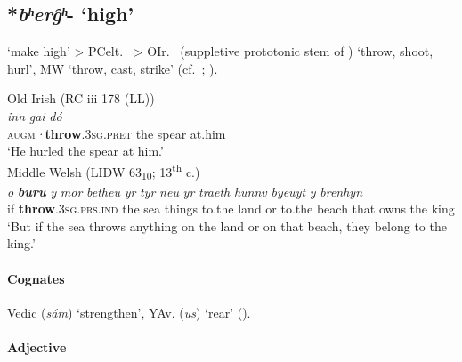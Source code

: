 \documentclass[output=paper,colorlinks,citecolor=brown]{langscibook}
\begin{document}
\subsection{*\textit{bʰerg̑ʰ}- ‘high’}
\label{sec:Caushigh}

 ‘make high’ > PCelt.\  > OIr.\   (suppletive prototonic stem of ) ‘throw, shoot, hurl’, MW  ‘throw, cast, strike’ (cf.\ \citealt[55--56]{Schrijver1995}; \citealt[120--121]{Schulze-Thulin2001}).


\begin{exe}
    \ex Old Irish (RC iii 178 (LL))\label{ex:Caushigh1}\\
         \textit{inn} \textit{gai} \textit{dó}  \\
        \textsc{augm}\textit{·}\textbf{throw}.\textsc{3sg.pret} the spear at.him\\
        \glt ‘He hurled the spear at him.’\\
    \ex Middle Welsh (LIDW 63\textsubscript{10}; 13\textsuperscript{th} c.)\label{ex:Caushigh2}\\
        \gll \textit{o} {\textbf{\textit{buru}} } \textit{y} \textit{mor} \textit{betheu} \textit{yr} \textit{tyr} \textit{neu} \textit{yr} \textit{traeth} \textit{hunnv} \textit{byeuyt} \textit{y} \textit{brenhyn} \\
        if \textbf{throw}.\textsc{3sg.prs.ind} the sea things to.the land or to.the beach that owns the king\\
        \glt ‘But if the sea throws anything on the land or on that beach, they belong to the king.’\\
\end{exe}

\paragraph*{Cognates}

Vedic (\textit{sám})  ‘strengthen’, YAv. (\textit{us})  ‘rear’ ().

\paragraph*{Adjective}
\end{document}
